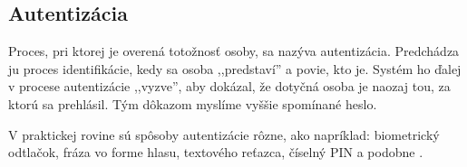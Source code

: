 \subsection{Autentizácia}
Proces, pri ktorej je overená totožnosť osoby, sa nazýva autentizácia. Predchádza ju proces identifikácie, kedy sa osoba ,,predstaví'' a povie, kto je. Systém ho ďalej v procese autentizácie ,,vyzve'', aby dokázal, že dotyčná osoba je naozaj tou, za ktorú sa prehlásil. Tým dôkazom myslíme vyššie spomínané heslo. \cite{2}
\par V praktickej rovine sú spôsoby autentizácie rôzne, ako napríklad: biometrický odtlačok, fráza vo forme hlasu, textového reťazca, číselný PIN a podobne \cite{3}. 